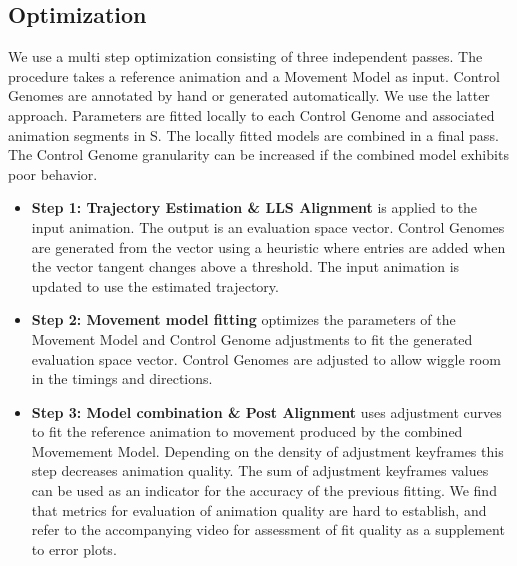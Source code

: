 \subsection{Optimization}
We use a multi step optimization consisting of three independent passes. The procedure takes a reference animation and a Movement Model as input. Control Genomes are annotated by hand or generated automatically. We use the latter approach. Parameters are fitted locally to each Control Genome and associated animation segments in S. The locally fitted models are combined in a final pass. The Control Genome granularity can be increased if the combined model exhibits poor behavior.
\begin{itemize}
    \item {\bf{Step 1: Trajectory Estimation \& LLS Alignment}} is applied to the input animation. The output is an evaluation space vector. Control Genomes are generated from the vector using a heuristic where entries are added when the vector tangent changes above a threshold. The input animation is updated to use the estimated trajectory.
    \item {\bf{Step 2: Movement model fitting}} optimizes the parameters of the Movement Model and Control Genome adjustments to fit the generated evaluation space vector. Control Genomes are adjusted to allow wiggle room in the timings and directions.
    \item {\bf{Step 3: Model combination \& Post Alignment}} uses adjustment curves to fit the reference animation to movement produced by the combined Movemement Model. Depending on the density of adjustment keyframes this step decreases animation quality. The sum of adjustment keyframes values can be used as an indicator for the accuracy of the previous fitting. We find that metrics for evaluation of animation quality are hard to establish, and refer to the accompanying video for assessment of fit quality as a supplement to error plots.
\end{itemize}


